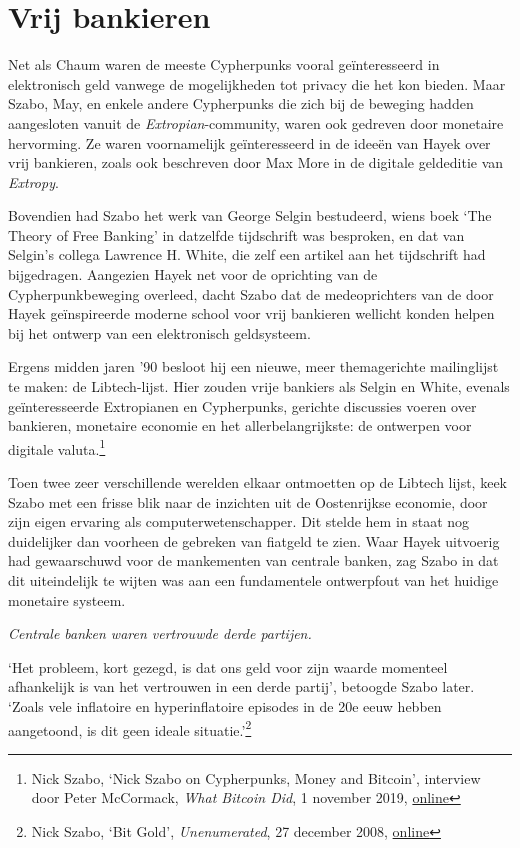 \documentclass[smalldemyvopaper,11pt,twoside,onecolumn,openright,extrafontsizes,hidelinks]{memoir}
\begin{document}
\section{Vrij bankieren}\label{vrij-bankieren}

Net als Chaum waren de meeste Cypherpunks vooral geïnteresseerd in
elektronisch geld vanwege de mogelijkheden tot privacy die het kon
bieden. Maar Szabo, May, en enkele andere Cypherpunks die zich bij de
beweging hadden aangesloten vanuit de \emph{Extropian}-community, waren
ook gedreven door monetaire hervorming. Ze waren voornamelijk
geïnteresseerd in de ideeën van Hayek over vrij bankieren, zoals ook
beschreven door Max More in de digitale geldeditie van \emph{Extropy}.

Bovendien had Szabo het werk van George Selgin bestudeerd, wiens boek
`The Theory of Free Banking' in datzelfde tijdschrift was besproken, en
dat van Selgin's collega Lawrence H. White, die zelf een artikel aan het
tijdschrift had bijgedragen. Aangezien Hayek net voor de oprichting van
de Cypherpunkbeweging overleed, dacht Szabo dat de medeoprichters van de
door Hayek geïnspireerde moderne school voor vrij bankieren wellicht
konden helpen bij het ontwerp van een elektronisch geldsysteem.

Ergens midden jaren '90 besloot hij een nieuwe, meer themagerichte
mailinglijst te maken: de Libtech-lijst. Hier zouden vrije bankiers als
Selgin en White, evenals geïnteresseerde Extropianen en Cypherpunks,
gerichte discussies voeren over bankieren, monetaire economie en het
allerbelangrijkste: de ontwerpen voor digitale valuta.\footnote{Nick
  Szabo, `Nick Szabo on Cypherpunks, Money and Bitcoin', interview door
  Peter McCormack, \emph{What Bitcoin Did}, 1 november 2019,
  \href{https://www.whatbitcoindid.com/podcast/nick-szabo-on-cypherpunks-money-and-bitcoin}{online}}

Toen twee zeer verschillende werelden elkaar ontmoetten op de Libtech
lijst, keek Szabo met een frisse blik naar de inzichten uit de
Oostenrijkse economie, door zijn eigen ervaring als
computerwetenschapper. Dit stelde hem in staat nog duidelijker dan
voorheen de gebreken van fiatgeld te zien. Waar Hayek uitvoerig had
gewaarschuwd voor de mankementen van centrale banken, zag Szabo in dat
dit uiteindelijk te wijten was aan een fundamentele ontwerpfout van het
huidige monetaire systeem.

\emph{Centrale banken waren vertrouwde derde partijen.}

`Het probleem, kort gezegd, is dat ons geld voor zijn waarde momenteel
afhankelijk is van het vertrouwen in een derde partij', betoogde Szabo
later. `Zoals vele inflatoire en hyperinflatoire episodes in de 20e eeuw
hebben aangetoond, is dit geen ideale situatie.'\footnote{Nick Szabo,
  `Bit Gold', \emph{Unenumerated}, 27 december 2008,
  \href{https://unenumerated.blogspot.com/2005/12/bit-gold.html}{online}}
\end{document}
